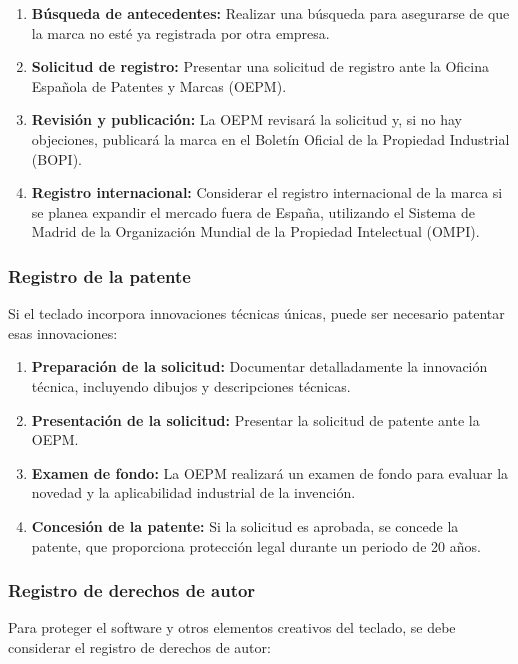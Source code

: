 \begin{enumerate}
    \item \textbf{Búsqueda de antecedentes:} Realizar una búsqueda para asegurarse de que la marca no esté ya registrada por otra empresa.
    \item \textbf{Solicitud de registro:} Presentar una solicitud de registro ante la Oficina Española de Patentes y Marcas (OEPM).
    \item \textbf{Revisión y publicación:} La OEPM revisará la solicitud y, si no hay objeciones, publicará la marca en el Boletín Oficial de la Propiedad Industrial (BOPI).
    \item \textbf{Registro internacional:} Considerar el registro internacional de la marca si se planea expandir el mercado fuera de España, utilizando el Sistema de Madrid de la Organización Mundial de la Propiedad Intelectual (OMPI).
\end{enumerate}

\subsubsection{Registro de la patente}

Si el teclado incorpora innovaciones técnicas únicas, puede ser necesario patentar esas innovaciones:

\begin{enumerate}
    \item \textbf{Preparación de la solicitud:} Documentar detalladamente la innovación técnica, incluyendo dibujos y descripciones técnicas.
    \item \textbf{Presentación de la solicitud:} Presentar la solicitud de patente ante la OEPM.
    \item \textbf{Examen de fondo:} La OEPM realizará un examen de fondo para evaluar la novedad y la aplicabilidad industrial de la invención.
    \item \textbf{Concesión de la patente:} Si la solicitud es aprobada, se concede la patente, que proporciona protección legal durante un periodo de 20 años.
\end{enumerate}

\subsubsection{Registro de derechos de autor}

Para proteger el software y otros elementos creativos del teclado, se debe considerar el registro de derechos de autor:

